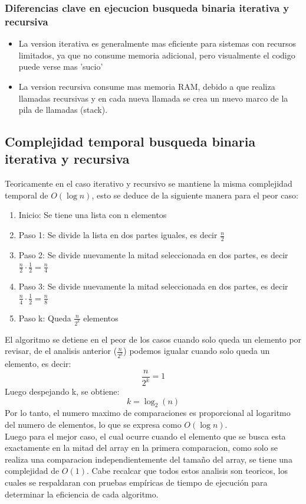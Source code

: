 \documentclass[9pt,letterpaper,onecolumn]{rho-class/rho}
\begin{document}
    \subsubsection{Diferencias clave en ejecucion busqueda binaria iterativa y recursiva}
        \begin{itemize}
            \item La version iterativa es generalmente mas eficiente para sistemas con recursos limitados, ya que no consume memoria adicional, pero
            visualmente el codigo puede verse mas 'sucio'
            \item La version recursiva consume mas memoria RAM, debido a que realiza llamadas recursivas y en cada nueva llamada se crea un
            nuevo marco de la pila de llamadas (stack).
        \end{itemize}

    \subsection{Complejidad temporal busqueda binaria iterativa y recursiva}\label{ssec:complejidad-busqueda-binaria}
        Teoricamente en el caso iterativo y recursivo se mantiene la misma complejidad temporal de $O(\log n)$, esto se deduce de la siguiente manera para el peor caso:
        \begin{enumerate} \label{enum:busqueda-binaria}
            \item Inicio: Se tiene una lista con n elementos
            \item Paso 1: Se divide la lista en dos partes iguales, es decir $\frac{n}{2}$
            \item Paso 2: Se divide nuevamente la mitad seleccionada en dos partes, es decir $\frac{n}{2} \cdot \frac{1}{2} = \frac{n}{4}$
            \item Paso 3: Se divide nuevamente la mitad seleccionada en dos partes, es decir $\frac{n}{4} \cdot \frac{1}{2} = \frac{n}{8}$
            \item Paso k: Queda $\frac{n}{2^k}$ elementos
        \end{enumerate}
        El algoritmo se detiene en el peor de los casos cuando solo queda un elemento por revisar, de el analisis anterior ($\frac{n}{2^k}$) podemos igualar
        cuando solo queda un elemento, es decir:
        $$\frac{n}{2^k} = 1$$
        Luego despejando k, se obtiene:
        $$k=\log_2(n)$$
        Por lo tanto, el numero maximo de comparaciones es proporcional al logaritmo del numero de elementos, lo que se expresa como $O(\log n)$.\\ 
        Luego para el mejor caso, el cual ocurre cuando el elemento que se busca esta exactamente en la mitad del array en la primera
        comparacion, como solo se realiza una comparacion independientemente del tamaño del array, se tiene una complejidad de $O(1)$.  
        Cabe recalcar que todos estos analisis son teoricos, los cuales se respaldaran con pruebas empíricas de tiempo de ejecución 
        para determinar la eficiencia de cada algoritmo.
\end{document}

